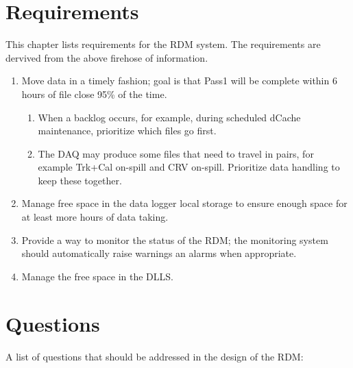 \chapter{Requirements}

This chapter lists requirements for the RDM system.
The requirements are dervived from the above firehose of information.

\begin{enumerate}
  \item Move data in a timely fashion; goal is that Pass1 will be complete within 6 hours of file close 95\% of the time.
  \begin{enumerate}
    \item When a backlog occurs, for example, during scheduled dCache maintenance, prioritize which files go first.
    \item The DAQ may produce some files that need to travel in pairs, for example Trk+Cal on-spill and CRV on-spill.
          Prioritize data handling to keep these together.
  \end{enumerate}
\item Manage free space in the data logger local storage to ensure enough space for at least  more
  hours of data taking.
\item Provide a way to monitor the status of the RDM;
  the monitoring system should automatically raise warnings an alarms when appropriate.
\item Manage the free space in the DLLS.
\end{enumerate}

\chapter{Questions}

A list of questions that should be addressed in the design of the RDM:

